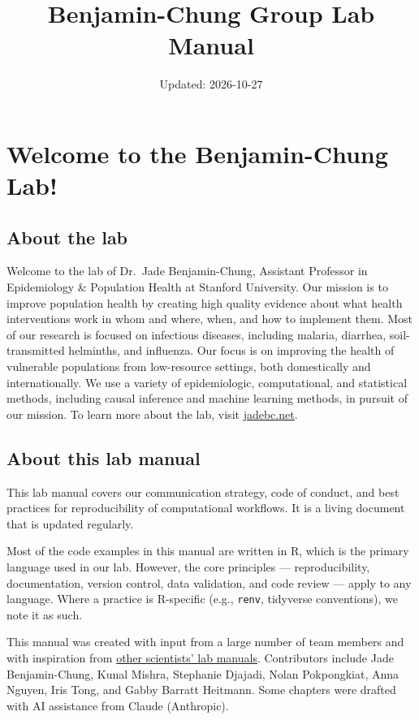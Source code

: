 \documentclass[
]{book}
\title{Benjamin-Chung Group Lab Manual}
\author{}
\date{\vspace{-2.5em}Updated: 2026-10-27}
\begin{document}
\maketitle

{
\setcounter{tocdepth}{1}
\tableofcontents
}
\chapter{Welcome to the Benjamin-Chung Lab!}\label{welcome-to-the-benjamin-chung-lab}

\section{About the lab}\label{about-the-lab}

Welcome to the lab of Dr.~Jade Benjamin-Chung, Assistant Professor in Epidemiology \& Population Health at Stanford University. Our mission is to improve population health by creating high quality evidence about what health interventions work in whom and where, when, and how to implement them. Most of our research is focused on infectious diseases, including malaria, diarrhea, soil-transmitted helminths, and influenza. Our focus is on improving the health of vulnerable populations from low-resource settings, both domestically and internationally. We use a variety of epidemiologic, computational, and statistical methods, including causal inference and machine learning methods, in pursuit of our mission. To learn more about the lab, visit \href{https://jadebc.net}{jadebc.net}.

\section{About this lab manual}\label{about-this-lab-manual}

This lab manual covers our communication strategy, code of conduct, and best practices for reproducibility of computational workflows. It is a living document that is updated regularly.

Most of the code examples in this manual are written in R, which is the primary language used in our lab. However, the core principles --- reproducibility, documentation, version control, data validation, and code review --- apply to any language. Where a practice is R-specific (e.g., \texttt{renv}, tidyverse conventions), we note it as such.

This manual was created with input from a large number of team members and with inspiration from \href{https://github.com/alylab/labmanual/blob/master/aly-lab-manual.pdf}{other scientists' lab manuals}.
Contributors include Jade Benjamin-Chung, Kunal Mishra, Stephanie Djajadi, Nolan Pokpongkiat, Anna Nguyen, Iris Tong, and Gabby Barratt Heitmann. Some chapters were drafted with AI assistance from Claude (Anthropic).
\end{document}
